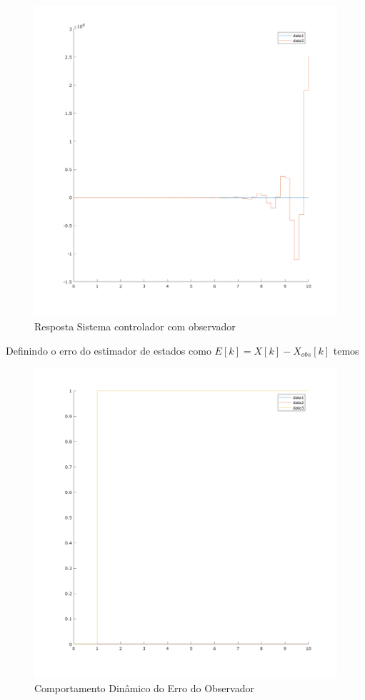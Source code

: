 \documentclass[a4paper,11pt]{article}
\begin{document}
\begin{figure}[H]
    \centering
    \includegraphics[width=0.9\linewidth]{img/exsim6-ssobs-sim.png}
    \caption{Resposta Sistema controlador com observador}
\end{figure}

Definindo o erro do estimador de estados como $E[k] = X[k] - X_{obs}[k]$ temos

\begin{figure}[H]
    \centering
    \includegraphics[width=0.9\linewidth]{img/exsim6-ssobs-err-sim.png}
    \caption{Comportamento Dinâmico do Erro do Observador}
\end{figure}
\end{document}
